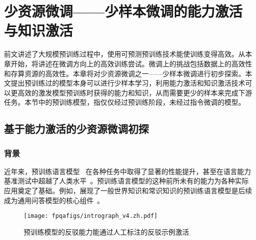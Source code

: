 \chapter{少资源微调——少样本微调的能力激活与知识激活}

前文讲述了大规模预训练过程中，使用可预测预训练技术能使训练变得高效。从本章开始，将讲述在微调方向上的高效训练尝试。微调上的挑战包括数据上的高效性和存算资源的高效性。本章将对少资源微调之一——少样本微调进行初步探索。本文提出预训练过的模型本身可以进行少样本学习，利用能力激活和知识激活技术可以更高效的激发模型预训练时获得的能力和知识，从而需要更少的样本来完成下游任务。本节中的预训练模型，指仅仅经过预训练阶段，未经过指令微调的模型。


\section{基于能力激活的少资源微调初探}

\subsection{背景}
近年来，预训练语言模型~\cite{lewis-etal-2020-bart, han2021pretrained, raffel2020exploring, brown2020language} 在各种任务中取得了显著的性能提升，甚至在语言能力基准测试中超越了人类水平~\cite{wang-etal-2018-glue, wang2019superglue,srivastava2022beyond}。预训练语言模型的这种前所未有的能力为各种实际应用奠定了基础。例如，展现了一般世界知识和常识知识的预训练语言模型是后续成为通用问答模型的核心组件~\cite{tafjord2021general,guu2020retrieval}。

\begin{figure}[!htpb]
    \centering
    \texttt{[image: fpqafigs/intrograph\_v4.zh.pdf]}
    \caption{预训练模型的反驳能力能通过人工标注的反驳示例激活}
    \label{fig:intrograph}
\end{figure}

\begin{table}[]
    \centering
    \caption{一些先前的研究指出了预训练模型面对误导性问题的脆弱性}
    \label{tab:intro_example}
\end{table}

